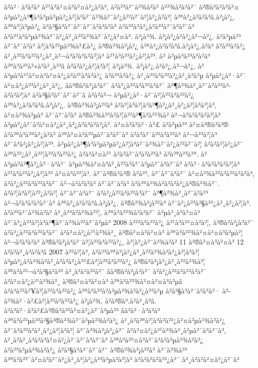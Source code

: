 à²à²·à³à²à³ à²¹à³à²¤à³à²¤à²¿à²à³, à²à²³à²¨à²¾à²à² à²²¾à²à³à²¯ à²®à³à²à³à²¤ à²µà²¿à²¶à³à²µà²µà²¿à²¦à³à²¯à²¾à²¨à²¿à²²à²¯à²¦à²¿à²à²¦ à²ªà²¿à²à²à³â.à²¡à²¿. à²ªà²¦à²µà²¿ à²à²§à³à²¯à²¯à²¨à²à³à²à³ à²à²³à²à²¿à²à²³à²¨à³à²¨à³ à²à²¹à³à²µà²¾à²¨à²¿à²¸à²²à²¾à²¯à²¿à²¤à³. à²¡à²¾. à²¡à²¿à²à²¿à²¬à²¿. à²à²µà²³ à²¨à²¨à²à³ à²¦à³à²²µà²¾à²£à²¿ à²®à²¾à²¡à²¿ à²ªà²¿à²à²à³â.à²¡à²¿.à²à³ à²à²³à²à²¿ à²¸à²²à³à²²à²¿à²¸à²¬à³à²à³à²à²¦à³ à²¹à³à²³à²¿à²¦à²³. à² à²µà³à²³à³à²à³ à²ªà³à²³à²«à³à²¸à²³â à²à²à²¿à²¦à³à²¦ à²¡à²¾. à²¡à²¿.à²à²¿.à²¬à²¿. à²à²µà²\circ à²¹à²¤à³à²¤à²¿à²\circ à²¹à³à²à²¿ à²à²³à²à²¿ à²¸à²²à³à²²à²¿à²¸à³à²µ à²µà²¿à²·à²¯ à²¤à²¿à²³à²¿à²¸à²¿, âà²®à²à²¡à³à²¯ à²à²¿à²²à³à²²à³à²¯ à²¶à²¾à²¸à²¨à²à²³à³- à²à²à²¦à³ à²à²§à³à²¯à²¯à²¨â à²à²à²¬ à²µà²¿à²·à²¯à²¦à²²à³à²²à²¿ à²ªà²¿à²à²à³â.à²¡à²¿. à²®à²¾à²¡à²²à³ à²à²¦à³à²¦à³à²¶à²¿à²¸à²¿à²¦à³à²¦à³, à²¤à²¾à²µà³ à²¨à²¨à²à³ à²®à²¾à²³à²à²¦à²³à²¶à²à²²¾à² à²¬à³à²à³à²à²¦à³ à²µà²¿à²¨à²à²¤à²¿à²¸à²¿à²à³à²à²¡à³. à²¤à²à³à²·à²£ à²à²µà²³ à²¤à²®à³à²® à²à²ªà³à²ªà²¿à²à³ à²ªà²¤à³à²²µà²¨à³à²¨à³ à²à³à²¯à²²à³à²²à³ à²¬à²³à²¦à³ à²¨à³à²¡à²¿à²¦à²³. à²µà²¿à²¶à³à²µà²µà²¿à²¦à³à²¯à²¾à²¨à²¿à²²à²¯à²¦ à²à²à²¦à²¿à²¨ à²ªà²²¿à²¸à²²¦à²²à³à²²à²¿ à²à²à²¤à²¹ à²à²à²¨à³à²à²³à³ à²à²ªà²³à²ª. à²à²µà²\circ à²¶à²¿à²·à³à²¯ à²µà²¾à²¤à³à²¸à²²à³à²¯à²µà²¨à³à²¨à³ à²à²·à³à²à³à²à²¦à³ à²¹à³à²³à²¿à²¦à²³ à²¤à³à²²¦à³. à²¨à²®à³à²® à²à²³, à²¨à²¨à³à²¨ à²¤à²¾à²²à³à²²à³à²à³, à²à²¿à²²à³à²²à³à²¯ à²¬à²à³à²à³ à²¨à²¨à²à³ à²à²ªà²¾à²\circ à²à²­à²¿à²®à²¾à²¨. à²à²¦à³à²¦à²²¿à²à²¦ à²¨à²¨à³à²¨ à²à²¿à²²à³à²²à³à²¯ à²¶à²¾à²¸à²¨à²à²³ à²¬à²à³à²à³à²¯à³ à²ªà²¿à²à²à³â.à²¡à²¿. à²®à²¾à²¡à²²à³ à²¨à²¿à²³à²§à²²¿à²¸à²¿à²¦à³. à²à²³à²¨à²¾à²à² à²¸à²³à²à²¾à²²¦, à²ªà³à²²¾à²à³à²¯ à²µà²¸à³à²¤à³ à²¨à²¿à²³à²¦à³à²¶à²¨à²¾à²²à²¯à²µà³ 2008 à²²²à³à²²à²¿ à²¹à³à²²¤à²à²¦, à²®à²à²¡à³à²¯ à²à²¿à²²à³à²²à³à²¯ à²à²¤à²¿à²¹à²¾à²¸ à²®à²¤à³à²¤à³ à²ªà³à²²¾à²¤à²¤à³à²µà²¦ à²¬à²à³à²à³ à²®à²à²¡à³à²¯à²¦à²²à³à²²à²¿, à²¦à²¿à²¨à²¾à²à² 11 à²®à²¤à³à²¤à³ 12 à²à²à²¸à³à²à³â 2007 à²²à²¦à³, à²à²³à²ªà²¡à²¿à²¸à²²à²¾à²à²¿à²¦à³à²¦ à²µà²¿à²à²¾à²\circ à²¸à²à²à²¿à²²£à²¦à²²à³à²²à²¿ à²®à²à²¡à²¿à²¸à²²à²¾à²¦ à²ªà³à²²¬à²à²§à²à²³ à²¸à²à²à²²à²¨ âà²®à²à²¡à³à²¯ à²à²¿à²²à³à²²à³à²¯ à²à²¤à²¿à²¹à²¾à²¸ à²®à²¤à³à²¤à³ à²ªà³à²²¾à²¤à²¤à³à²µâ à²à³à²²à²¥à²¦à²²à³à²²à²¿ à²ªà³à²²à²à²µà²¾à²à²¿à²³à²µ à²à²§à³à²¯à²à³à²· à²­à²¾à²·à²£à²¦à²²à³à²²à²¿ à²¡à²¾. à²à²®à³.à²à²¸à³â. à²à³à²·à³à²£à²®à³à²³à²¤à²¿à²¯à²µà²³ âà²à²·à³à²à³ à²ªà³à²²µà²³à²§à²®à²¾à²¨à²µà²¾à²à²¿ à²¸à²à²ªà²¦à³à²­à²²¿à²¤à²µà²¾à²à²¿ à²¨à³à²²à³à²¸à²¿à²¦à³à²¦ à²¨à²¾à²¡à²¿à²¨ à²à²¤à²¿à²¹à²¾à²¸à²µà²¨à³à²¨à³, à²¸à²à²¸à³à²à³à²¤à²¿à²¯à²¨à³à²¨à³ à²ªà³à²²¤à³à²¯à³à²à²µà²¾à²à²¿ à²à²³à²µà²¾à²à²¿ à²à²§à³à²¯à²¯à²¨ à²®à²¾à²¡à²²à³ à²¯à²¾à²³ à²ªà³à²²¯à²¤à³à²¨à²¿à²¸à²¦à²¿à²³à²µà³à²¦à³ à²à²à³à²à²²¿à²¯ à²¸à²à²à²¤à²¿à²¯à³ 